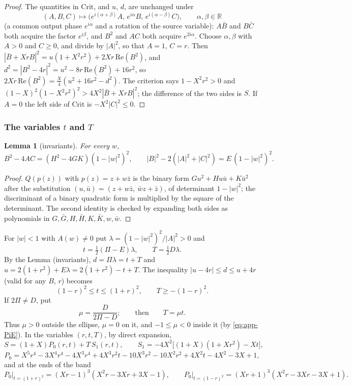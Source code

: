 \documentclass[11pt,reqno]{amsart}
\theoremstyle{plain}
\newtheorem*{lemma}{Lemma}
\theoremstyle{definition}
\theoremstyle{remark}
\newcommand{\R}{\mathbb{R}}
\newcommand{\Crit}{\mathrm{Crit}}
\begin{document}
\begin{proof}
The quantities in $\Crit$, and $u$, $d$, are unchanged under
\[
  (A,B,C)\mapsto\bigl(e^{i(\alpha+\beta)}A,\,e^{i\alpha}B,\,e^{i(\alpha-\beta)}C\bigr),\qquad\alpha,\beta\in\R
\]
(a common output phase $e^{i\alpha}$ and a rotation of the source variable): $A\bar B$ and $B\bar C$
both acquire the factor $e^{i\beta}$, and $B^{2}$ and $AC$ both acquire $e^{2i\alpha}$. Choose
$\alpha,\beta$ with $A>0$ and $C\ge0$, and divide by $|A|^{2}$, so that $A=1$, $C=r$. Then
$|\bar B+XrB|^{2}=u(1+X^{2}r^{2})+2Xr\,\mathrm{Re}(B^{2})$, and
$d^{2}=|B^{2}-4r|^{2}=u^{2}-8r\,\mathrm{Re}(B^{2})+16r^{2}$, so
$2Xr\,\mathrm{Re}(B^{2})=\frac X4(u^{2}+16r^{2}-d^{2})$. The criterion says $1-X^{2}r^{2}>0$ and
$(1-X)^{2}(1-X^{2}r^{2})^{2}>4X^{2}|\bar B+XrB|^{2}$; the difference of the two sides is $S$. If $A=0$
the left side of $\Crit$ is $-X^{2}|C|^{2}\le0$.
\end{proof}

\subsubsection{The variables $t$ and $T$}

\begin{lemma}[invariants]
For every $w$,
\[
  B^{2}-4AC=(H^{2}-4GK)(1-|w|^{2})^{2},\qquad |B|^{2}-2(|A|^{2}+|C|^{2})=E\,(1-|w|^{2})^{2}.
\]
\end{lemma}

\begin{proof}
$Q(p(z))$ with $p(z)=z+w\bar z$ is the binary form $Gu^{2}+Hu\bar u+K\bar u^{2}$ after the substitution
$(u,\bar u)=(z+w\bar z,\ \bar wz+\bar z)$, of determinant $1-|w|^{2}$; the discriminant of a binary
quadratic form is multiplied by the square of the determinant. The second identity is checked by
expanding both sides as polynomials in $G,\bar G,H,\bar H,K,\bar K,w,\bar w$.
\end{proof}

For $|w|<1$ with $A(w)\ne0$ put $\lambda=(1-|w|^{2})^{2}/|A|^{2}>0$ and
\[
  t=\tfrac12(\Pi-E)\lambda,\qquad T=\tfrac12D\lambda .
\]
By the Lemma (invariants), $d=\Pi\lambda=t+T$ and $u=2(1+r^{2})+E\lambda=2(1+r^{2})-t+T$. The inequality
$|u-4r|\le d\le u+4r$ (valid for any $B$, $r$) becomes
\begin{equation}\label{eq:app-band}
  (1-r)^{2}\le t\le(1+r)^{2},\qquad T\ge-(1-r)^{2} .
\end{equation}
If $2\Pi\ne D$, put
\[
  \mu=\frac{D}{2\Pi-D};\qquad\text{then}\qquad T=\mu t .
\]
Thus $\mu>0$ outside the ellipse, $\mu=0$ on it, and $-1\le\mu<0$ inside it (by \eqref{eq:app-PiE}). In the
variables $(r,t,T)$, by direct expansion,
\begin{equation}\label{eq:app-Slin}
  S=(1+X)P_0(r,t)+T\,S_1(r,t),\qquad S_1=-4X^{2}\bigl[(1+X)(1+Xr^{2})-Xt\bigr],
\end{equation}
\[
  P_0=X^{5}r^{4}-3X^{4}r^{4}-4X^{3}r^{4}+4X^{3}r^{2}t-10X^{3}r^{2}-10X^{2}r^{2}+4X^{2}t-4X^{2}-3X+1,
\]
and at the ends of the band
\begin{equation}\label{eq:app-P0ends}
  P_0\big|_{t=(1+r)^{2}}=(Xr-1)^{3}(X^{2}r-3Xr+3X-1),\qquad
  P_0\big|_{t=(1-r)^{2}}=(Xr+1)^{3}(X^{2}r-3Xr-3X+1).
\end{equation}
\end{document}
